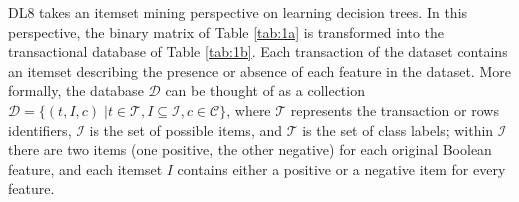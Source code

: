 DL8 takes an itemset mining perspective on learning decision trees. In this perspective, the binary matrix of Table \ref{tab:1a} is transformed into the transactional database of Table \ref{tab:1b}. Each transaction of the dataset contains an itemset describing the presence or absence of each feature in the dataset. More formally, the database $\mathcal{D}$ can be thought of as a collection $\mathcal{D} = \{(t, I, c)\;|t\in \mathcal{T} , I \subseteq \mathcal{I}, c \in \mathcal{C}\}$, where $\mathcal{T}$ represents the transaction or rows identifiers, $\mathcal{I}$ is the set of possible items, and $\mathcal{T}$ is the set of class labels; within $\mathcal{I}$ there are two items (one positive, the other negative) for each original Boolean feature, and each itemset $I$ contains either a positive or a negative item for every feature.
\begin{table}
	~
	\caption{Example database}
	\label{tab:1}
\end{table}


